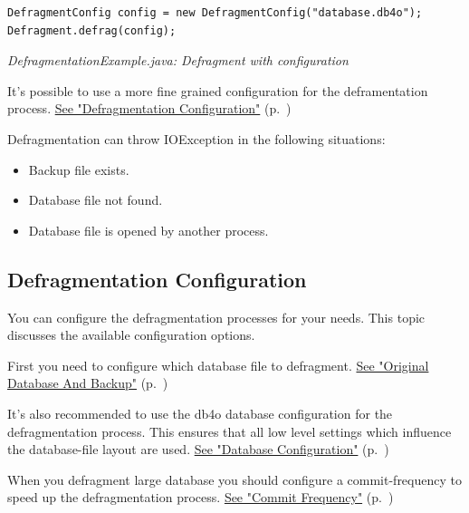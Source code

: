 \begin{lstlisting}
DefragmentConfig config = new DefragmentConfig("database.db4o");
Defragment.defrag(config);
\end{lstlisting}

{\small\itshape DefragmentationExample.java: Defragment with configuration\par}
\medskip

It's possible to use a more fine grained configuration for the deframentation process. \hyperref[ref:advanced-topics-defragment-defragmentation-configuration]{See "Defragmentation Configuration"} (p.~\pageref{ref:advanced-topics-defragment-defragmentation-configuration})

Defragmentation can throw IOException in the following situations:

\begin{itemize}
\item Backup file exists.
\item Database file not found.
\item Database file is opened by another process.
\end{itemize}

\subsection{Defragmentation Configuration}
\label{ref:advanced-topics-defragment-defragmentation-configuration}

You can configure the defragmentation processes for your needs. This topic discusses the available configuration options.

First you need to configure which database file to defragment. \hyperref[ref:advanced-topics-defragment-configuration-database-files]{See "Original Database And Backup"} (p.~\pageref{ref:advanced-topics-defragment-configuration-database-files})

It's also recommended to use the db4o database configuration for the defragmentation process. This ensures that all low level settings which influence the database-file layout are used. \hyperref[ref:advanced-topics-defragment-configuration-database-configuration]{See "Database Configuration"} (p.~\pageref{ref:advanced-topics-defragment-configuration-database-configuration})

When you defragment large database you should configure a commit-frequency to speed up the defragmentation process. \hyperref[ref:advanced-topics-defragment-configuration-commit-frequency]{See "Commit Frequency"} (p.~\pageref{ref:advanced-topics-defragment-configuration-commit-frequency})

